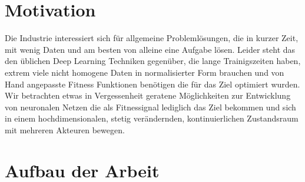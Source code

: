 \section{Motivation}
Die Industrie interessiert sich für allgemeine Problemlösungen, die in kurzer Zeit, mit wenig Daten und am besten von alleine eine Aufgabe lösen. Leider steht das den üblichen Deep Learning Techniken gegenüber, die lange Trainigszeiten haben, extrem viele nicht homogene Daten in normalisierter Form brauchen und von Hand angepasste Fitness Funktionen benötigen die für das Ziel optimiert wurden. Wir betrachten etwas in Vergessenheit geratene Möglichkeiten zur Entwicklung von neuronalen Netzen die als Fitnessignal lediglich das Ziel bekommen und sich in einem hochdimensionalen, stetig verändernden, kontinuierlichen Zustandsraum mit mehreren Akteuren bewegen.



\section{Aufbau der Arbeit}


